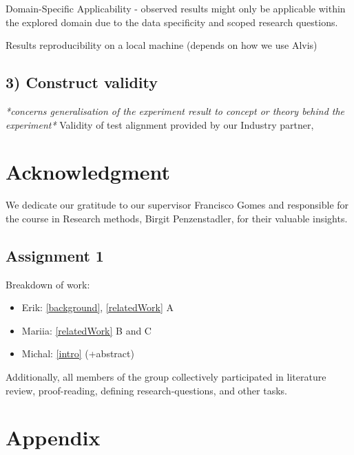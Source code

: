 \documentclass[conference]{IEEEtran}
\begin{document}
    Domain-Specific Applicability - observed results might only be applicable within the explored domain due to the data specificity and scoped research questions.
    
    Results reproducibility on a local machine (depends on how we use Alvis)

\subsection*{\textbf{3) Construct validity}}
\textit{    *concerns generalisation of the experiment result to concept or theory behind the experiment*
}
Validity of test alignment provided by our Industry partner,  

\section*{Acknowledgment}
We dedicate our gratitude to our supervisor Francisco Gomes and responsible for the course in Research methods, Birgit Penzenstadler, for their valuable insights.

\subsection*{Assignment 1}

Breakdown of work:
\begin{itemize}
    \item Erik: \ref{background}, \ref{relatedWork} A
    \item Mariia: \ref{relatedWork} B and C
    \item Michal: \ref{intro} (+abstract)
\end{itemize}

Additionally, all members of the group collectively participated in literature
review, proof-reading, defining research-questions, and other tasks.




\section*{Appendix}\label{appendix}
\end{document}
